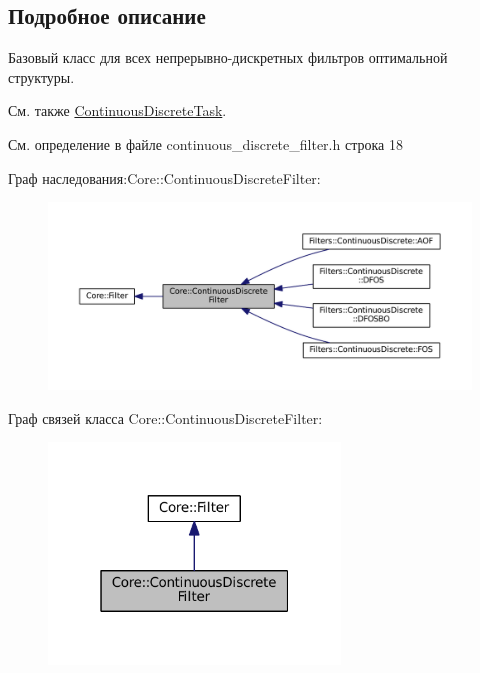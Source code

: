 \subsection{Подробное описание}
Базовый класс для всех непрерывно-\/дискретных фильтров оптимальной структуры. 

\begin{DoxySeeAlso}{См. также}
\hyperlink{class_core_1_1_continuous_discrete_task}{Continuous\+Discrete\+Task}. 
\end{DoxySeeAlso}


См. определение в файле continuous\+\_\+discrete\+\_\+filter.\+h строка 18



Граф наследования\+:Core\+:\+:Continuous\+Discrete\+Filter\+:\nopagebreak
\begin{figure}[H]
\begin{center}
\leavevmode
\includegraphics[width=350pt]{class_core_1_1_continuous_discrete_filter__inherit__graph}
\end{center}
\end{figure}


Граф связей класса Core\+:\+:Continuous\+Discrete\+Filter\+:\nopagebreak
\begin{figure}[H]
\begin{center}
\leavevmode
\includegraphics[width=220pt]{class_core_1_1_continuous_discrete_filter__coll__graph}
\end{center}
\end{figure}



